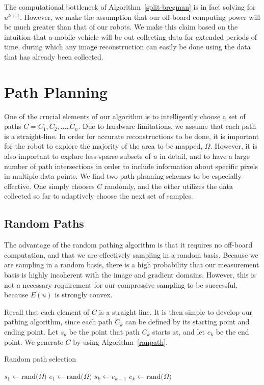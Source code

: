 \documentclass[english]{article}\usepackage[]{graphicx}\usepackage[]{color}
\begin{document}
The computational bottleneck of Algorithm~\ref{split-bregman} is in fact solving for $u^{k+1}$. However, we make the assumption that 
our off-board computing power will be much greater than that of our robots. We make this claim based on the intuition that a mobile vehicle will be out collecting data for extended periods of time, during which any image reconstruction can easily be done using the data that has already been collected.

\section{Path Planning}

One of the crucial elements of our algorithm is to intelligently choose a set of paths $C=C_1,C_2,\dots,C_n$. Due to hardware 
limitations, we assume that each path is a straight-line. In order 
for accurate reconstructions to be done, it is important for the robot to explore the majority of the area to 
be mapped, $\Omega$. However, it is also important to explore less-sparse subsets of $u$ in detail, and to have a large number 
of path intersections in order to include information about specific pixels in multiple data points. We find two path planning schemes 
to be especially effective. One simply chooses $C$ randomly, and the other utilizes the data collected so far to adaptively choose the next set of samples.

\subsection{Random Paths}

The advantage of the random pathing algorithm is that it requires no off-board computation, and that we are effectively sampling in a 
random basis. Because we are sampling in a random basis, there is a high probability that our measurement basis is highly incoherent 
with the image and gradient domains. However, this is not a necessary requirement for our compressive sampling to be successful, 
because $E(u)$ is strongly convex.

Recall that each element of $C$ is a straight line. It is then simple to develop our pathing algorithm, since each path $C_k$ can be 
defined by its starting point and ending point. Let $s_k$ be the point that path $C_k$ starts at, and let $e_k$ be the end point. We generate $C$ by using Algorithm~\ref{ranpath}.

\begin{algorithm}[H]
\caption{Random path selection}\label{ranpath}
\begin{algorithmic}[1]
\State $s_1\gets \text{rand(}\Omega)$
\State $e_1\gets \text{rand(}\Omega)$
\State $s_k\gets e_{k-1}$
\State $e_k\gets \text{rand(}\Omega)$
\EndFor
\EndProcedure
\end{algorithmic}
\end{algorithm}
\end{document}
